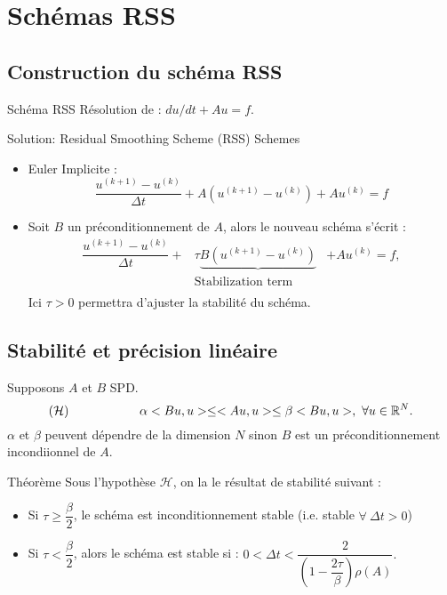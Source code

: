 \documentclass[11pt]{beamer}
\begin{document}

\section{Schémas RSS}
\subsection{Construction du schéma RSS}
\begin{frame}{Schéma RSS}
Résolution de : $du/dt + Au = f$.
\begin{block}{Solution: Residual
Smoothing Scheme (RSS) Schemes}
\begin{itemize}
	\item Euler Implicite :
	$$
	\dfrac{u^{(k+1)}-u^{(k)}}{\Delta t} +A(u^{(k+1)}-u^{(k)})+Au^{(k)}=f
	$$
	\pause
	\item Soit $B$ un préconditionnement de $A$, alors le nouveau schéma s'écrit :
	\begin{equation}
\begin{array}{lcl}
\dfrac{u^{(k+1)}-u^{(k)}}{\Delta t}+&\tau
\underbrace{B(u^{(k+1)}-u^{(k)})}&+Au^{(k)}=f,\\
 & \mbox{Stabilization term}& \\
 \end{array}
\end{equation}
Ici $\tau>0$ permettra d'ajuster la stabilité du schéma.
       \end{itemize}	
	\end{block}

\end{frame}

\subsection{Stabilité et précision linéaire}
\begin{frame}{}
Supposons $A$ et $B$ SPD. 
$$
({\mathcal{H}})\hskip 2.cm  \alpha <Bu,u>\le <Au,u> \le \beta <Bu,u>, \ \forall u \in {\mathbb R}^N.
$$
$\alpha$ et $\beta$ peuvent dépendre de la dimension $N$ sinon $B$ est un préconditionnement incondiionnel de $A$.
\pause
\begin{block}{Théorème}
Sous l'hypothèse ${\mathcal{H}}$, on la le résultat de stabilité suivant :
\begin{itemize}
\item Si $\tau\ge \dfrac{\beta}{2}$, le schéma est inconditionnement stable (i.e. stable $\forall \ \Delta t >0$)
\item Si $\tau < \dfrac{\beta}{2}$, alors le schéma est stable si :
$
0<\Delta t < \dfrac{2}{\left(1-\dfrac{2\tau}{\beta}\right)\rho(A)}.
$
\end{itemize} 
\label{RSS_Stab_lin}
\end{block}
\end{frame}
\end{document}
